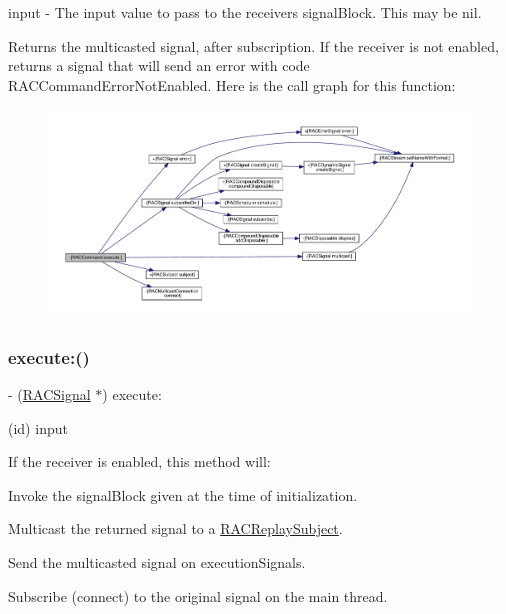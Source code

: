input -\/ The input value to pass to the receiver\textquotesingle{}s {\ttfamily signal\+Block}. This may be nil.

Returns the multicasted signal, after subscription. If the receiver is not enabled, returns a signal that will send an error with code R\+A\+C\+Command\+Error\+Not\+Enabled. Here is the call graph for this function\+:\nopagebreak
\begin{figure}[H]
\begin{center}
\leavevmode
\includegraphics[width=350pt]{interface_r_a_c_command_a91d8d0063d512d5989382e89013a0d74_cgraph}
\end{center}
\end{figure}
\mbox{\label{interface_r_a_c_command_a91d8d0063d512d5989382e89013a0d74}} 
\subsubsection{\texorpdfstring{execute\+:()}{execute:()}\hspace{0.1cm}{\footnotesize\ttfamily [3/3]}}
{\footnotesize\ttfamily -\/ (\mbox{\hyperlink{interface_r_a_c_signal}{R\+A\+C\+Signal}} $\ast$) execute\+: \begin{DoxyParamCaption}\item[{(id)}]{input }\end{DoxyParamCaption}}

If the receiver is enabled, this method will\+:


\begin{DoxyEnumerate}
\item Invoke the {\ttfamily signal\+Block} given at the time of initialization.
\item Multicast the returned signal to a \mbox{\hyperlink{interface_r_a_c_replay_subject}{R\+A\+C\+Replay\+Subject}}.
\item Send the multicasted signal on {\ttfamily execution\+Signals}.
\item Subscribe (connect) to the original signal on the main thread.
\end{DoxyEnumerate}

